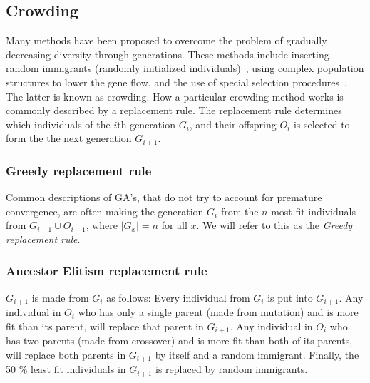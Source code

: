 \subsection{Crowding}
Many methods have been proposed to overcome the problem of gradually decreasing diversity through generations. These methods include inserting random immigrants (randomly initialized individuals)~\cite{Cobb93geneticalgorithms}, using complex population structures to lower the gene flow, and the use of special selection procedures~\cite{ursem2002diversity}. The latter is known as crowding. How a particular crowding method works is commonly described by a replacement rule.
The replacement rule determines which individuals of the $i$th generation $G_i$,
and their offspring $O_i$ is selected to form the the next generation $G_{i+1}$.

\subsubsection{Greedy replacement rule}
Common descriptions of GA's, that do not try to account for premature convergence,
are often making the generation $G_i$ from the $n$ most fit individuals from $G_{i-1} \cup O_{i-1}$,
where $\lvert G_x \rvert = n$ for all $x$\cite{ma.sterThesisGANN}.
We will refer to this as the \emph{Greedy replacement rule}.

%
%

\subsubsection{Ancestor Elitism replacement rule}
$G_{i+1}$ is made from $G_i$ as follows:
Every individual from $G_i$ is put into $G_{i+1}$.
Any individual in $O_i$ who has only a single parent (made from mutation) and is more fit than its parent, will replace that parent in $G_{i+1}$.
Any individual in $O_i$ who has two parents (made from crossover) and is more fit than both of its parents, will replace both parents in $G_{i+1}$ by itself and a random immigrant.
Finally, the 50 \% least fit individuals in $G_{i+1}$ is replaced by random immigrants.


